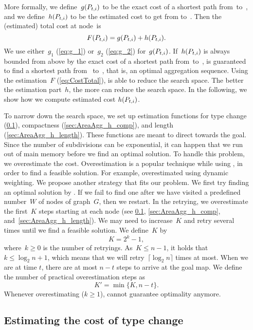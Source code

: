 More formally, we define~$g(P_{t,i})$ to be 
the exact cost of a shortest path from~\Pstart to~\Pnode, 
and we define~$h(P_{t,i})$ to be the estimated cost 
to get from \Pnode to~\Pgoal. 
Then the (estimated) total cost at node~\Pnode is
\begin{equation}
\label{eq:CostTotal}
F(P_{t,i})=g(P_{t,i})+h(P_{t,i}).
\end{equation}
We use either~$g_1$ (\eq\ref{eq:g_1}) 
or~$g_2$ (\eq\ref{eq:g_2})
for~$g(P_{t,i})$.
If~$h(P_{t,i})$ is always bounded from above 
by the exact cost of a shortest path from~\Pnode to~\Pgoal, 
\Astar is guaranteed to find a shortest path from~\Pstart 
to~\Pgoal, 
that is, an optimal aggregation sequence.  
Using the estimation~$F$ (\eq\ref{eq:CostTotal}), 
\Astar is able to reduce the search space.
The better the estimation part~$h$, 
the more \Astar can reduce the search space.
In the following, we show how we compute
estimated cost $h(P_{t,i})$.

To narrow down the search space, 
we set up estimation functions 
for type change (\sect\ref{sec:AreaAgg_h_type}), 
compactness (\sect\ref{sec:AreaAgg_h_comp}), 
and length (\sect\ref{sec:AreaAgg_h_length}). 
These functions are meant to direct \Astar towards the goal.
Since the number of subdivisions can be exponential, 
it can happen that we run out of main memory 
before we find an optimal solution. 
To handle this problem, we overestimate the cost. 
Overestimation is a popular technique while using \Astar,
in order to find a feasible solution. 
For example, \textcite{Pohl1973} overestimated 
using dynamic weighting. 
We propose another strategy that fits our problem. 
We first try finding an optimal solution by \Astar. 
If we fail to find one after 
we have visited a predefined number~$W$ of nodes of graph~$G$,
then we restart.
In the retrying, we overestimate the first~$K$ steps 
starting at each node
(see \sects\ref{sec:AreaAgg_h_type}, \ref{sec:AreaAgg_h_comp},
and~\ref{sec:AreaAgg_h_length}).
We may need to increase~$K$ and retry several times 
until we find a feasible solution.
We define~$K$ by
\[
K= 2^k -1,
\]
where~$k\ge 0$ is the number of retryings.
As~$K\le n-1$, it holds that~$k \le \log_2 n +1$, 
which means  that we will 
retry~$\lceil \log_2 n\rceil$ times at most.
When we are at time $t$, there are at most $n-t$ steps 
to arrive at the goal map.
We define the number of practical overestimation steps as
\[
K'= \min \{K, n-t\}.
\]
Whenever overestimating ($k\geq1$), 
\Astar cannot guarantee optimality anymore.


\subsection{Estimating the cost of type change}
\label{sec:AreaAgg_h_type}

